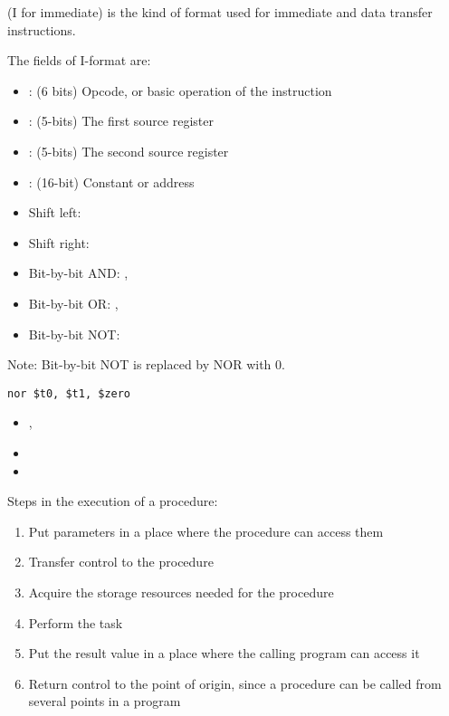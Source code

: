     \par {} (I for immediate) is the kind of format used for
      immediate and data transfer instructions.
    \par The fields of I-format are:
    \begin{itemize}
      \item {}: (6 bits) Opcode, or basic operation of the instruction
      \item {}: (5-bits) The first source register
      \item {}: (5-bits) The second source register
      \item {}: (16-bit) Constant or address
    \end{itemize}


  \begin{itemize}
    \item Shift left: 
    \item Shift right: 
    \item Bit-by-bit AND: , 
    \item Bit-by-bit OR: , 
    \item Bit-by-bit NOT: 
  \end{itemize}
  \par Note: Bit-by-bit NOT is replaced by NOR with 0.
\begin{lstlisting}
nor $t0, $t1, $zero
\end{lstlisting}


  \begin{itemize}
    \item {}, 
    \item {}
    \item {}
  \end{itemize}

    \par Steps in the execution of a procedure:
    \begin{enumerate}
      \item Put parameters in a place where the procedure can access them
      \item Transfer control to the procedure
      \item Acquire the storage resources needed for the procedure
      \item Perform the task
      \item Put the result value in a place where the calling program can access
        it
      \item Return control to the point of origin, since a procedure can be
        called from several points in a program
    \end{enumerate}


